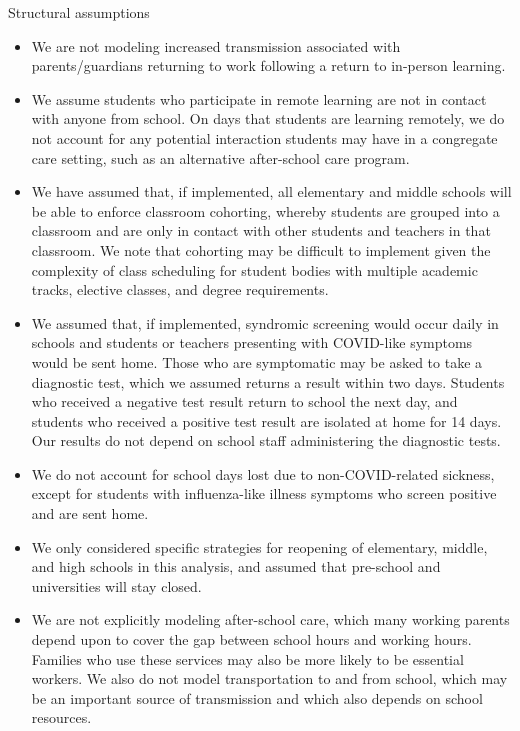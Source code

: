 \documentclass[preprint,12pt]{elsarticle}
\begin{document}
Structural assumptions
\begin{itemize}
    \item We are not modeling increased transmission associated with parents/guardians returning to work following a return to in-person learning.
    \item We assume students who participate in remote learning are not in contact with anyone from school. On days that students are learning remotely, we do not account for any potential interaction students may have in a congregate care setting, such as an alternative after-school care program.
    \item We have assumed that, if implemented, all elementary and middle schools will be able to enforce classroom cohorting, whereby students are grouped into a classroom and are only in contact with other students and teachers in that classroom. We note that cohorting may be difficult to implement given the complexity of class scheduling for student bodies with multiple academic tracks, elective classes, and degree requirements. 
    \item We assumed that, if implemented, syndromic screening would occur daily in schools and students or teachers presenting with COVID-like symptoms would be sent home. Those who are symptomatic may be asked to take a diagnostic test, which we assumed returns a result within two days. Students who received a negative test result return to school the next day, and students who received a positive test result are isolated at home for 14 days. Our results do not depend on school staff administering the diagnostic tests.
    \item We do not account for school days lost due to non-COVID-related sickness, except for students with influenza-like illness symptoms who screen positive and are sent home.
    \item We only considered specific strategies for reopening of elementary, middle, and high schools in this analysis, and assumed that pre-school and universities will stay closed.
    \item We are not explicitly modeling after-school care, which many working parents depend upon to cover the gap between school hours and working hours. Families who use these services may also be more likely to be essential workers. We also do not model transportation to and from school, which may be an important source of transmission and which also depends on school resources.
\end{itemize}
\end{document}
